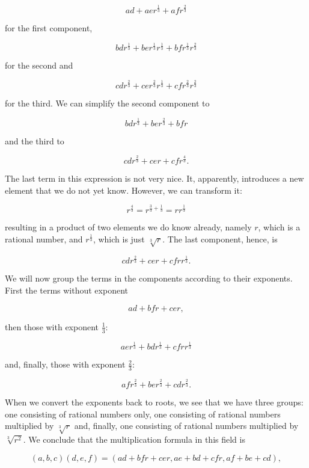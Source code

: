 \documentclass[tikz]{scrreprt}
\begin{document}
\[
ad+aer^{\frac{1}{3}}+afr^{\frac{2}{3}}
\]

for the first component,

\[
bdr^{\frac{1}{3}}+ber^{\frac{1}{3}}r^{\frac{1}{3}}+bfr^{\frac{1}{3}}r^{\frac{2}{3}}
\]

for the second and

\[
cdr^{\frac{2}{3}}+cer^{\frac{2}{3}}r^{\frac{1}{3}}+cfr^{\frac{2}{3}}r^{\frac{2}{3}}
\]

for the third.
We can simplify the second component to

\[
bdr^{\frac{1}{3}}+ber^{\frac{2}{3}}+bfr
\]

and the third to

\[
cdr^{\frac{2}{3}}+cer+cfr^{\frac{4}{3}}.
\]

The last term in this expression is not very nice.
It, apparently, introduces a new element that we do not yet know.
However, we can transform it:

\[
r^{\frac{4}{3}} = r^{\frac{3}{3} + \frac{1}{3}} = rr^{\frac{1}{3}}
\]

resulting in a product of two elements we do know already,
namely $r$, which is a rational number, and $r^{\frac{1}{3}}$,
which is just $\sqrt[3]{r}$.
The last component, hence, is

\[
cdr^{\frac{2}{3}}+cer+cfrr^{\frac{1}{3}}.
\]

We will now group the terms in the components according 
to their exponents. First the terms without exponent

\[
ad + bfr + cer,
\]

then those with exponent $\frac{1}{3}$:

\[
aer^{\frac{1}{3}} + bdr^{\frac{1}{3}} + cfrr^{\frac{1}{3}}
\]

and, finally, those with exponent $\frac{2}{3}$:

\[
afr^{\frac{2}{3}} + ber^{\frac{2}{3}} + cdr^{\frac{2}{3}}.
\]

When we convert the exponents back to roots, we see that
we have three groups:
one consisting of rational numbers only,
one consisting of rational numbers multiplied by $\sqrt[3]{r}$
and, finally, one consisting of rational numbers
multiplied by $\sqrt[3]{r^2}$.
We conclude that the multiplication formula in this field is

\begin{equation}\label{fieldExtMul3}
(a,b,c)(d,e,f) = (ad+bfr+cer,ae+bd+cfr,af+be+cd),
\end{equation}
\end{document}
